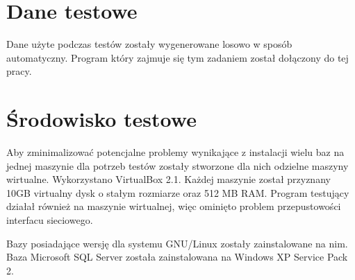 

% 



\section{Dane testowe}

Dane użyte podczas testów zostały wygenerowane losowo w sposób automatyczny. 
Program który zajmuje się tym zadaniem został dołączony do tej pracy.





\section{Środowisko testowe}

Aby zminimalizować potencjalne problemy wynikające z instalacji wielu baz na jednej maszynie dla potrzeb testów zostały stworzone dla nich odzielne maszyny wirtualne. Wykorzystano VirtualBox 2.1. Każdej maszynie został przyznany 10GB virtualny dysk o stałym rozmiarze oraz 512 MB RAM. Program testujący działał również na maszynie wirtualnej, więc ominięto problem przepustowości interfacu sieciowego. 

Bazy posiadające wersję dla systemu GNU/Linux zostały zainstalowane na nim. Baza Microsoft SQL Server została zainstalowana na Windows XP Service Pack 2.
